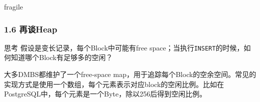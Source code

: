 \documentclass[aspectratio=169, 14pt]{beamer}
\begin{document}
%
%
%
%
%
%
\begin{frame}{fragile}
	\frametitle{1.6 再谈Heap}
	\begin{block}{思考}
		假设是变长记录，每个Block中可能有free space；当执行\texttt{INSERT}的时候，如何知道哪个Block有足够多的空闲？
	\end{block}

	\pause

	大多DMBS都维护了一个\alert{free-space map}，用于追踪每个Block的空余空间。常见的实现方式是使用一个数组，每个元素表示对应block的空闲比例。比如在PostgreSQL中，每个元素是一个Byte，除以256后得到空闲比例。
\end{frame}
\end{document}
